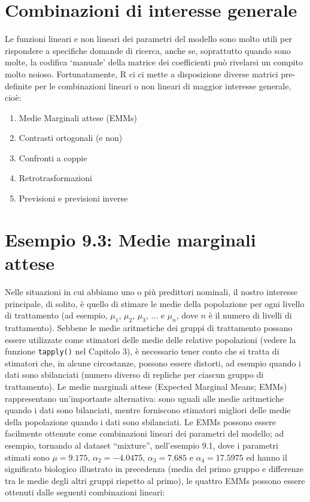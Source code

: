 \documentclass[
  12pt,
]{book}
\providecommand{\tightlist}{%
  \setlength{\itemsep}{0pt}\setlength{\parskip}{0pt}}
\begin{document}
\hypertarget{combinazioni-di-interesse-generale}{%
\section{Combinazioni di interesse generale}\label{combinazioni-di-interesse-generale}}

Le funzioni lineari e non lineari dei parametri del modello sono molto utili per rispondere a specifiche domande di ricerca, anche se, soprattutto quando sono molte, la codifica `manuale' della matrice dei coefficienti può rivelarsi un compito molto noioso. Fortunatamente, R ci ci mette a disposizione diverse matrici pre-definite per le combinazioni lineari o non lineari di maggior interesse generale, cioè:

\begin{enumerate}
\def\labelenumi{\arabic{enumi}.}
\tightlist
\item
  Medie Marginali attese (EMMs)
\item
  Contrasti ortogonali (e non)
\item
  Confronti a coppie
\item
  Retrotrasformazioni
\item
  Previsioni e previsioni inverse
\end{enumerate}

\section{Esempio 9.3: Medie marginali attese}

Nelle situazioni in cui abbiamo uno o più predittori nominali, il nostro interesse principale, di solito, è quello di stimare le medie della popolazione per ogni livello di trattamento (ad esempio, \(\mu_1\), \(\mu_2\), \(\mu_3\), \(\ldots{}\) e \(\mu_n\), dove \(n\) è il numero di livelli di trattamento). Sebbene le medie aritmetiche dei gruppi di trattamento possano essere utilizzate come stimatori delle medie delle relative popolazioni (vedere la funzione \texttt{tapply()} nel Capitolo 3), è necessario tener conto che si tratta di stimatori che, in alcune circostanze, possono essere distorti, ad esempio quando i dati sono sbilanciati (numero diverso di repliche per ciascun gruppo di trattamento). Le medie marginali attese (Expected Marginal Means; EMMs) rappresentano un'importante alternativa: sono uguali alle medie aritmetiche quando i dati sono bilanciati, mentre forniscono stimatori migliori delle medie della popolazione quando i dati sono sbilanciati. Le EMMs possono essere facilmente ottenute come combinazioni lineari dei parametri del modello; ad esempio, tornando al dataset ``mixture'', nell'esempio 9.1, dove i parametri stimati sono \(\mu = 9.175\), \(\alpha_2 = -4.0475\), \(\alpha_3 = 7.685\) e \(\alpha_4 = 17.5975\) ed hanno il significato biologico illustrato in precedenza (media del primo gruppo e differenze tra le medie degli altri gruppi rispetto al primo), le quattro EMMs possono essere ottenuti dalle seguenti combinazioni lineari:
\end{document}
